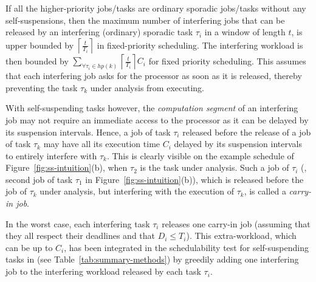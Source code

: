 \label{sec:model-carry-in}

If all the higher-priority jobs/tasks are ordinary sporadic jobs/tasks without any self-suspensions, then
the maximum number of interfering jobs that can be released by an interfering (ordinary) sporadic task $\tau_i$ in a window of length $t$, is upper bounded by $\left\lceil \frac{t}{T_i} \right\rceil$ in fixed-priority scheduling. The interfering workload is then bounded by $\sum_{\forall \tau_i \in hp(k)} \left\lceil \frac{t}{T_i} \right\rceil C_i$ for fixed priority scheduling. This assumes that each interfering job asks for the processor as soon as it is released, thereby preventing the task $\tau_k$ under analysis from executing.

With self-suspending tasks however, the \emph{computation segment} of an interfering job may not require an immediate access to the processor as it can be delayed by its suspension intervals. Hence, a job of task $\tau_i$ released before the release of a job of task $\tau_k$ may have all its execution time $C_i$ delayed by its suspension intervals to entirely interfere with $\tau_k$. 
This is clearly visible on the example schedule of Figure~\ref{fig:ss-intuition}(b), when $\tau_2$ is the task under analysis.
Such a job of $\tau_i$ (\eg, second job of task $\tau_1$ in Figure~\ref{fig:ss-intuition}(b)), which is released before the job of $\tau_k$ under analysis, but interfering with the execution of $\tau_k$, is called a \emph{carry-in job}.

In the worst case, each interfering task $\tau_i$ releases one carry-in job (assuming that they all respect their deadlines and that $D_i \leq T_i$). This extra-workload, which can be up to $C_i$, has been integrated in the schedulability test for self-suspending tasks in \cite{huangpass:dac2015,LiuChen:rtss2014} (see Table~\ref{tab:summary-methods}) by greedily adding one interfering job to the interfering workload released by each task $\tau_i$.




